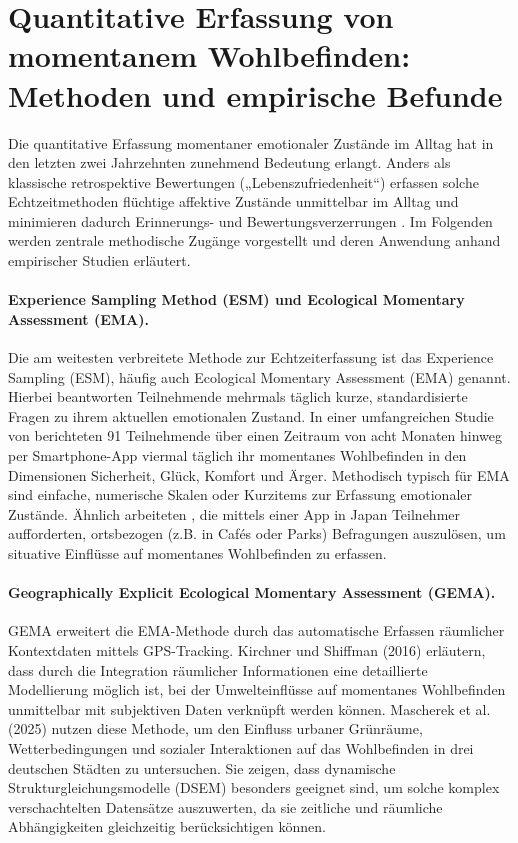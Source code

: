 \section{Quantitative Erfassung von moment­anem Wohlbefinden: Methoden und empirische Befunde}

Die quantitative Erfassung momentaner emotionaler Zustände im Alltag hat in den letzten zwei Jahrzehnten zunehmend Bedeutung erlangt. Anders als klassische retrospektive Bewertungen („Lebenszufriedenheit“) erfassen solche Echtzeitmethoden flüchtige affektive Zustände unmittelbar im Alltag und minimieren dadurch Erinnerungs- und Bewertungsverzerrungen \citep{kahnemanDevelopmentsMeasurementSubjective2006a}. Im Folgenden werden zentrale methodische Zugänge vorgestellt und deren Anwendung anhand empirischer Studien erläutert.

\paragraph{Experience Sampling Method (ESM) und Ecological Momentary Assessment (EMA).}
Die am weitesten verbreitete Methode zur Echtzeiterfassung ist das Experience Sampling (ESM), häufig auch Ecological Momentary Assessment (EMA) genannt. Hierbei beantworten Teilnehmende mehrmals täglich kurze, standardisierte Fragen zu ihrem aktuellen emotionalen Zustand. In einer umfangreichen Studie von \citet{birenboimInfluenceUrbanEnvironments2018} berichteten 91 Teilnehmende über einen Zeitraum von acht Monaten hinweg per Smartphone-App viermal täglich ihr momentanes Wohlbefinden in den Dimensionen Sicherheit, Glück, Komfort und Ärger. Methodisch typisch für EMA sind einfache, numerische Skalen oder Kurzitems zur Erfassung emotionaler Zustände. Ähnlich arbeiteten \citet{chenPerceivedUrbanEnvironment2025}, die mittels einer App in Japan Teilnehmer aufforderten, ortsbezogen (z.B. in Cafés oder Parks) Befragungen auszulösen, um situative Einflüsse auf momentanes Wohlbefinden zu erfassen.

\paragraph{Geographically Explicit Ecological Momentary Assessment (GEMA).}
GEMA erweitert die EMA-Methode durch das automatische Erfassen räumlicher Kontextdaten mittels GPS-Tracking. Kirchner und Shiffman (2016) erläutern, dass durch die Integration räumlicher Informationen eine detaillierte Modellierung möglich ist, bei der Umwelteinflüsse auf momentanes Wohlbefinden unmittelbar mit subjektiven Daten verknüpft werden können. Mascherek et al. (2025) nutzen diese Methode, um den Einfluss urbaner Grünräume, Wetterbedingungen und sozialer Interaktionen auf das Wohlbefinden in drei deutschen Städten zu untersuchen. Sie zeigen, dass dynamische Strukturgleichungsmodelle (DSEM) besonders geeignet sind, um solche komplex verschachtelten Datensätze auszuwerten, da sie zeitliche und räumliche Abhängigkeiten gleichzeitig berücksichtigen können.

